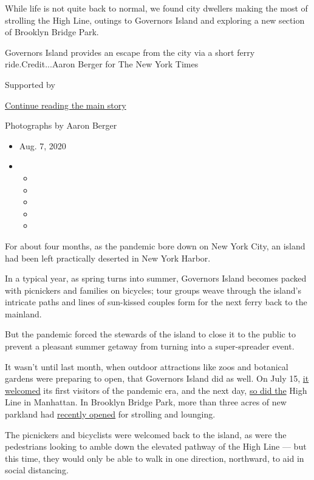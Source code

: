 While life is not quite back to normal, we found city dwellers making
the most of strolling the High Line, outings to Governors Island and
exploring a new section of Brooklyn Bridge Park.

Governors Island provides an escape from the city via a short ferry
ride.Credit...Aaron Berger for The New York Times

Supported by

\protect\hyperlink{after-sponsor}{Continue reading the main story}

Photographs by Aaron Berger

\begin{itemize}
\item
  Aug. 7, 2020
\item
  \begin{itemize}
  \item
  \item
  \item
  \item
  \item
  \end{itemize}
\end{itemize}

For about four months, as the pandemic bore down on New York City, an
island had been left practically deserted in New York Harbor.

In a typical year, as spring turns into summer, Governors Island becomes
packed with picnickers and families on bicycles; tour groups weave
through the island's intricate paths and lines of sun-kissed couples
form for the next ferry back to the mainland.

But the pandemic forced the stewards of the island to close it to the
public to prevent a pleasant summer getaway from turning into a
super-spreader event.

It wasn't until last month, when outdoor attractions like zoos and
botanical gardens were preparing to open, that Governors Island did as
well. On July 15,
\href{https://twitter.com/Gov_Island/status/1283509265345458179}{it
welcomed} its first visitors of the pandemic era, and the next day,
\href{https://twitter.com/highlinenyc/status/1283495932202561539}{so did
the} High Line in Manhattan. In Brooklyn Bridge Park, more than three
acres of new parkland had
\href{https://www.brooklynbridgepark.org/blog/news-media/pier-2-uplands-opens-july-6-2020}{recently
opened} for strolling and lounging.

The picnickers and bicyclists were welcomed back to the island, as were
the pedestrians looking to amble down the elevated pathway of the High
Line --- but this time, they would only be able to walk in one
direction, northward, to aid in social distancing.

